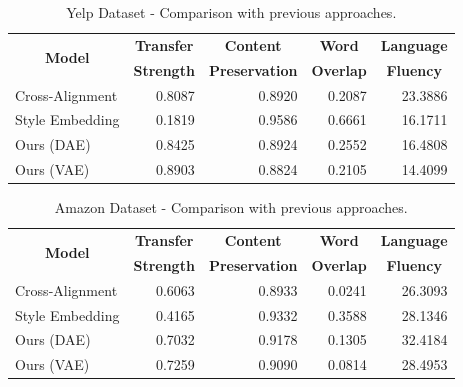 \documentclass[11pt,a4paper]{article}
\newcommand{\tabh}[1]{\multicolumn{1}{c|}{\textbf{#1}}}
\newcommand{\tabc}[2]{\multicolumn{1}{|c|}{\multirow{#1}{*}{\textbf{#2}}}}
\begin{document}
\begin{table}[ht]
	\centering
	\begin{tabular}{| l | r | r | r | r |}
		\hline
		\tabc{2}{Model}                       & \tabh{Transfer} & \tabh{Content}      & \tabh{Word}    & \tabh{Language} \\
		                                      & \tabh{Strength} & \tabh{Preservation} & \tabh{Overlap} & \tabh{Fluency}  \\
		\hline
		\hline
		Cross-Alignment \citep{shen2017style} & 0.8087          & 0.8920              & 0.2087         & 23.3886         \\
		\hline
		Style Embedding \citep{fu2017style}   & 0.1819          & 0.9586              & 0.6661         & 16.1711         \\
		\hline
		Ours (DAE)                            & 0.8425          & 0.8924              & 0.2552         & 16.4808         \\
		\hline
		Ours (VAE)                            & 0.8903          & 0.8824              & 0.2105         & 14.4099         \\
		\hline
	\end{tabular}
	\caption{Yelp Dataset - Comparison with previous approaches.}
	\label{tab:yelp-comparison-previous}
\end{table}

\begin{table}[ht]
	\centering
	\begin{tabular}{| l | r | r | r | r |}
		\hline
		\tabc{2}{Model}                       & \tabh{Transfer} & \tabh{Content}      & \tabh{Word}    & \tabh{Language} \\
		                                      & \tabh{Strength} & \tabh{Preservation} & \tabh{Overlap} & \tabh{Fluency}  \\
		\hline
		\hline
		Cross-Alignment \citep{shen2017style} & 0.6063          & 0.8933              & 0.0241         & 26.3093         \\
		\hline
		Style Embedding \citep{fu2017style}   & 0.4165          & 0.9332              & 0.3588         & 28.1346         \\
		\hline
		Ours (DAE)                            & 0.7032          & 0.9178              & 0.1305         & 32.4184         \\
		\hline
		Ours (VAE)                            & 0.7259          & 0.9090              & 0.0814         & 28.4953         \\
		\hline
	\end{tabular}
	\caption{Amazon Dataset - Comparison with previous approaches.}
	\label{tab:amazon-comparison-previous}
\end{table}
\end{document}
